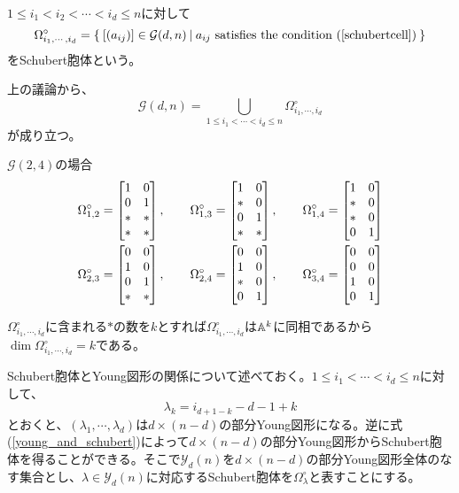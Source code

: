 \documentclass{ltjsreport}
\begin{document}
\begin{defin}
  $1\leq i_1<i_2<\cdots<i_d\leq n$に対して
  \[
  \Omega^\circ_{i_1,\cdots,i_d}=\left\{\:[(a_{ij})]\in\mathcal{G}(d,n)\:\middle|\:a_{ij}\text{ satisfies the condition (\ref{schubertcell})}\:\right\}  
  \]
  をSchubert胞体という。
\end{defin}

上の議論から、
\[
\mathcal{G}(d,n)=\bigcup_{1\leq i_1<\cdots<i_d\leq n}\Omega^\circ_{i_1,\cdots,i_d}  
\]
が成り立つ。

\begin{eg}
$\mathcal{G}(2,4)$の場合
  \begin{align*}
    &\Omega^\circ_{1,2}=\begin{bmatrix} 
      1 & 0\\
      0 & 1\\
      * & *\\
      * & *
     \end{bmatrix},\qquad 
    \Omega^\circ_{1,3}=\begin{bmatrix} 
      1 & 0\\
      * & 0\\
      0 & 1\\
      * & *
     \end{bmatrix},\qquad
    \Omega^\circ_{1,4}=\begin{bmatrix} 
      1 & 0\\
      * & 0\\
      * & 0\\
      0 & 1
     \end{bmatrix}\\
    &\Omega^\circ_{2,3}=\begin{bmatrix} 
      0 & 0\\
      1 & 0\\
      0 & 1\\
      * & *
     \end{bmatrix},\qquad
    \Omega^\circ_{2,4}=\begin{bmatrix} 
      0 & 0\\
      1 & 0\\
      * & 0\\
      0 & 1
     \end{bmatrix},\qquad
    \Omega^\circ_{3,4}=\begin{bmatrix} 
      0 & 0\\
      0 & 0\\
      1 & 0\\
      0 & 1
     \end{bmatrix}
  \end{align*}
\end{eg}

$\Omega^\circ_{i_1,\cdots,i_d}$に含まれる$*$の数を$k$とすれば$\Omega^\circ_{i_1,\cdots,i_d}$は$\mathbb{A}^k$に同相であるから$\dim\Omega^\circ_{i_1,\cdots,i_d}=k$である。

Schubert胞体とYoung図形の関係について述べておく。$1\leq i_1<\cdots<i_d\leq n$に対して、
\begin{equation}\label{young_and_schubert}
\lambda_{k}=i_{d+1-k}-d-1+k  
\end{equation}
とおくと、$(\lambda_1,\cdots,\lambda_d)$は$d\times (n-d)$の部分Young図形になる。逆に式(\ref{young_and_schubert})によって$d\times (n-d)$の部分Young図形からSchubert胞体を得ることができる。そこで$\mathcal{Y}_d(n)$を$d\times (n-d)$の部分Young図形全体のなす集合とし、$\lambda\in\mathcal{Y}_d(n)$に対応するSchubert胞体を$\Omega^\circ_{\lambda}$と表すことにする。
\end{document}

